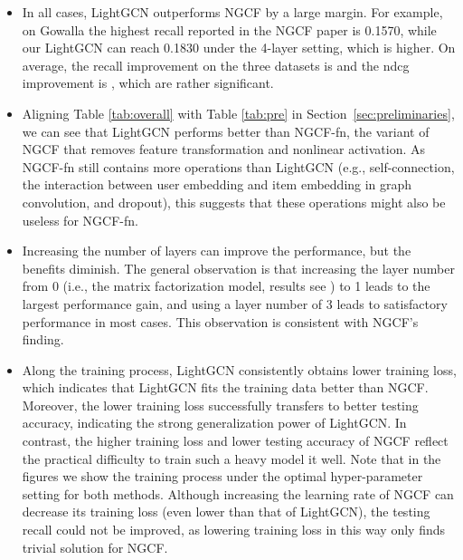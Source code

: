 \documentclass[sigconf]{acmart}
\theoremstyle{definition}
\begin{document}
\begin{itemize}[leftmargin=*]
    \item In all cases, LightGCN outperforms NGCF by a large margin. For example, on Gowalla the highest recall reported in the NGCF paper is 0.1570, while our LightGCN can reach 0.1830 under the 4-layer setting, which is  higher. On average, the recall improvement on the three datasets is  and the ndcg improvement is , which are rather significant.
    \item Aligning Table \ref{tab:overall} with Table \ref{tab:pre} in Section~\ref{sec:preliminaries}, we can see that LightGCN performs better than NGCF-fn, the variant of NGCF that removes feature transformation and nonlinear activation. As NGCF-fn still contains more operations than LightGCN (e.g., self-connection, the interaction between user embedding and item embedding in graph convolution, and dropout), this suggests that these operations might also be useless for NGCF-fn. 
    \item Increasing the number of layers can improve the performance, but the benefits diminish. The general observation is that increasing the layer number from 0 (i.e., the matrix factorization model, results see \cite{NGCF}) to 1 leads to the largest performance gain, and using a layer number of 3 leads to satisfactory performance in most cases. This observation is consistent with NGCF's finding.
\item Along the training process, LightGCN consistently obtains lower training loss, which indicates that LightGCN fits the training data better than NGCF. Moreover, the lower training loss successfully transfers to better testing accuracy, indicating the strong generalization power of LightGCN. In contrast, the higher training loss and lower testing accuracy of NGCF reflect the practical difficulty to train such a heavy model it well. Note that in the figures we show the training process under the optimal hyper-parameter setting for both methods. Although increasing the learning rate of NGCF can decrease its training loss (even lower than that of LightGCN), the testing recall could not be improved, as lowering training loss in this way only finds trivial solution for NGCF. 
\end{itemize}
\end{document}
